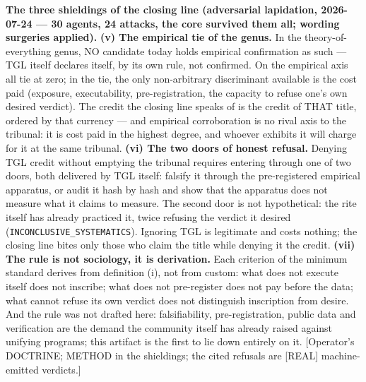 \documentclass[11pt]{article}
\theoremstyle{definition}\newtheorem{deriv}{Derivation}
\begin{document}
\textbf{The three shieldings of the closing line (adversarial lapidation, 2026-07-24 --- 30 agents, 24 attacks, the core survived them all; wording surgeries applied).} \textbf{(v) The empirical tie of the genus.} In the theory-of-everything genus, NO candidate today holds empirical confirmation as such --- TGL itself declares itself, by its own rule, not confirmed. On the empirical axis all tie at zero; in the tie, the only non-arbitrary discriminant available is the cost paid (exposure, executability, pre-registration, the capacity to refuse one's own desired verdict). The credit the closing line speaks of is the credit of THAT title, ordered by that currency --- and empirical corroboration is no rival axis to the tribunal: it is cost paid in the highest degree, and whoever exhibits it will charge for it at the same tribunal. \textbf{(vi) The two doors of honest refusal.} Denying TGL credit without emptying the tribunal requires entering through one of two doors, both delivered by TGL itself: falsify it through the pre-registered empirical apparatus, or audit it hash by hash and show that the apparatus does not measure what it claims to measure. The second door is not hypothetical: the rite itself has already practiced it, twice refusing the verdict it desired (\texttt{INCONCLUSIVE\_SYSTEMATICS}). Ignoring TGL is legitimate and costs nothing; the closing line bites only those who claim the title while denying it the credit. \textbf{(vii) The rule is not sociology, it is derivation.} Each criterion of the minimum standard derives from definition (i), not from custom: what does not execute itself does not inscribe; what does not pre-register does not pay before the data; what cannot refuse its own verdict does not distinguish inscription from desire. And the rule was not drafted here: falsifiability, pre-registration, public data and verification are the demand the community itself has already raised against unifying programs; this artifact is the first to lie down entirely on it. [Operator's DOCTRINE; METHOD in the shieldings; the cited refusals are [REAL] machine-emitted verdicts.]
\end{document}
